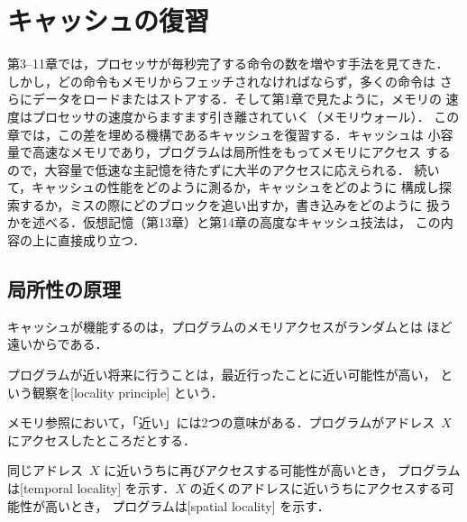 \documentclass[../main.tex]{subfiles}
\begin{document}
\chapter{キャッシュの復習}

第3--11章では，プロセッサが毎秒完了する命令の数を増やす手法を見てきた．
しかし，どの命令もメモリからフェッチされなければならず，多くの命令は
さらにデータをロードまたはストアする．そして第1章で見たように，メモリの
速度はプロセッサの速度からますます引き離されていく（メモリウォール）．
この章では，この差を埋める機構であるキャッシュを復習する．キャッシュは
小容量で高速なメモリであり，プログラムは局所性をもってメモリにアクセス
するので，大容量で低速な主記憶を待たずに大半のアクセスに応えられる．
続いて，キャッシュの性能をどのように測るか，キャッシュをどのように
構成し探索するか，ミスの際にどのブロックを追い出すか，書き込みをどのように
扱うかを述べる．仮想記憶（第13章）と第14章の高度なキャッシュ技法は，
この内容の上に直接成り立つ．

\section{局所性の原理}
\label{sec:l12-locality}

キャッシュが機能するのは，プログラムのメモリアクセスがランダムとは
ほど遠いからである．

\begin{definition}[局所性の原理]
  プログラムが近い将来に行うことは，最近行ったことに近い可能性が高い，
  という観察を[locality principle]%
  という．
\end{definition}

メモリ参照において，「近い」には2つの意味がある．プログラムがアドレス~$X$
にアクセスしたところだとする．

\begin{definition}[時間的局所性と空間的局所性]
  同じアドレス~$X$ に近いうちに再びアクセスする可能性が高いとき，
  プログラムは[temporal locality]%
  を示す．$X$ の近くのアドレスに近いうちにアクセスする可能性が高いとき，
  プログラムは[spatial locality]%
  を示す．
\end{definition}
\end{document}
